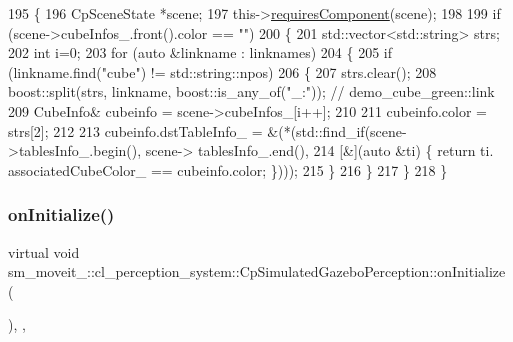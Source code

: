 \begin{DoxyCode}
195             \{
196                 CpSceneState *scene;
197                 this->\hyperlink{classsmacc_1_1ISmaccComponent_aa06d58b1dcec3c513ca2edddfd3847ec}{requiresComponent}(scene);
198 
199                 \textcolor{keywordflow}{if} (scene->cubeInfos\_.front().color == \textcolor{stringliteral}{""})
200                 \{
201                     std::vector<std::string> strs;
202                     \textcolor{keywordtype}{int} i=0;
203                     \textcolor{keywordflow}{for} (\textcolor{keyword}{auto} &linkname : linknames)
204                     \{
205                         \textcolor{keywordflow}{if} (linkname.find(\textcolor{stringliteral}{"cube"}) != std::string::npos)
206                         \{
207                             strs.clear();
208                             boost::split(strs, linkname, boost::is\_any\_of(\textcolor{stringliteral}{"\_:"})); \textcolor{comment}{// demo\_cube\_green::link}
209                             CubeInfo& cubeinfo = scene->cubeInfos\_[i++];
210 
211                             cubeinfo.color = strs[2];
212 
213                             cubeinfo.dstTableInfo\_ = &(*(std::find\_if(scene->tablesInfo\_.begin(), scene->
      tablesInfo\_.end(),
214                                                                       [&](\textcolor{keyword}{auto} &ti) \{ \textcolor{keywordflow}{return} ti.
      associatedCubeColor\_ == cubeinfo.color; \})));
215                         \}
216                     \}
217                 \}
218             \}
\end{DoxyCode}
\mbox{\label{classsm__moveit__4_1_1cl__perception__system_1_1CpSimulatedGazeboPerception_adebc30f6b1fc905f783de3f7bdf4a711}} 
\subsubsection{\texorpdfstring{on\+Initialize()}{onInitialize()}}
{\footnotesize\ttfamily virtual void sm\+\_\+moveit\+\_\+::cl\+\_\+perception\+\_\+system\+::\+Cp\+Simulated\+Gazebo\+Perception\+::on\+Initialize (\begin{DoxyParamCaption}{ }\end{DoxyParamCaption})\hspace{0.3cm}{\ttfamily [inline]}, {\ttfamily [override]}, {\ttfamily [virtual]}}



